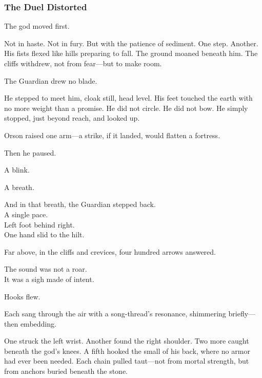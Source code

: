 \documentclass[12pt]{article}
\begin{document}
\dotfill

\subsubsection*{The Duel Distorted}

The god moved first.

\vspace{0.5em}
Not in haste. Not in fury. But with the patience of sediment. One step. Another. His fists flexed like hills preparing to fall. The ground moaned beneath him. The cliffs withdrew, not from fear---but to make room.

\vspace{0.5em}
The Guardian drew no blade.

\vspace{0.5em}
He stepped to meet him, cloak still, head level. His feet touched the earth with no more weight than a promise. He did not circle. He did not bow. He simply stopped, just beyond reach, and looked up.

\vspace{0.5em}
Orson raised one arm---a strike, if it landed, would flatten a fortress.

\vspace{0.5em}
Then he paused.

\vspace{0.5em}
A blink.

\vspace{0.5em}
A breath.

\vspace{0.5em}
And in that breath, the Guardian stepped back.\\
A single pace.\\
Left foot behind right.\\
One hand slid to the hilt.

\vspace{0.5em}
Far above, in the cliffs and crevices, four hundred arrows answered.

\vspace{0.5em}
The sound was not a roar.\\
It was a sigh made of intent.

\vspace{0.5em}
Hooks flew.

\vspace{0.5em}
Each sang through the air with a song-thread’s resonance, shimmering briefly---then embedding.

\vspace{0.5em}
One struck the left wrist. Another found the right shoulder. Two more caught beneath the god’s knees. A fifth hooked the small of his back, where no armor had ever been needed. Each chain pulled taut---not from mortal strength, but from anchors buried beneath the stone.
\end{document}
